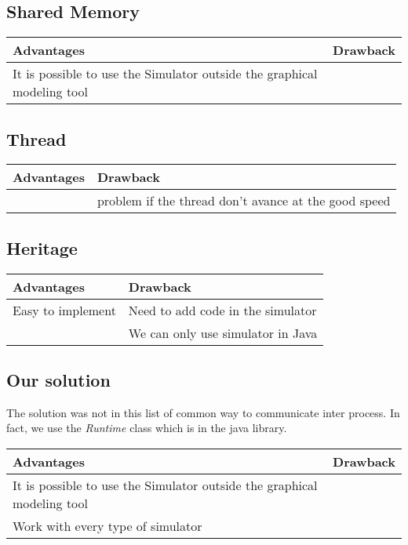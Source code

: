 \subsection{Shared Memory}

\begin{tabular}{|p{}||p{}|}
\hline
  \textbf{Advantages}&\textbf{Drawback}\\
\hline
It is possible to use the Simulator outside the graphical modeling tool & \\
\hline
\end{tabular}


\subsection{Thread}

\begin{tabular}{|p{}||p{}|}
\hline
  \textbf{Advantages}&\textbf{Drawback}\\
\hline
&problem if the thread don't avance at the good speed\\
\hline
\end{tabular}

\subsection{Heritage}

\begin{tabular}{|p{}||p{}|}
\hline
  \textbf{Advantages}&\textbf{Drawback}\\
\hline
Easy to implement&Need to add code in the simulator\\
\hline
&We can only use simulator in Java\\
\hline
\end{tabular}



\subsection{Our solution}

The solution was not in this list of common way to communicate inter process. In fact, we use the \textit{Runtime} class which is in the java library.~\\

\noindent
\begin{tabular}{|p{}||p{}|}
\hline
  \textbf{Advantages}&\textbf{Drawback}\\
\hline
It is possible to use the Simulator outside the graphical modeling tool & \\
\hline
Work with every type of simulator& \\
\hline
\end{tabular}




